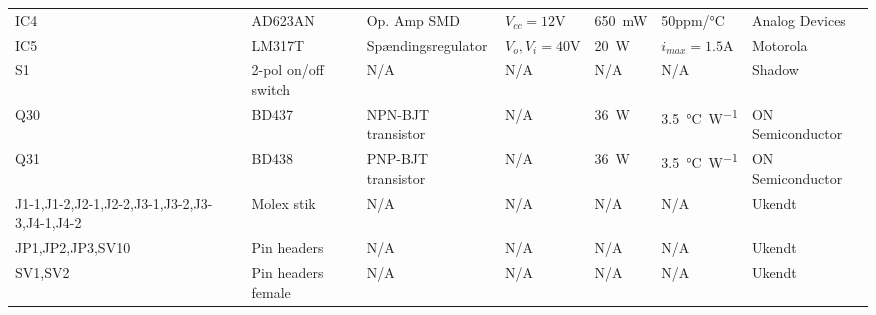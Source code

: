 \begin{table}[h!]
\begin{threeparttable}
\begin{tabular}{ l l l l l l l }
IC4 & AD623AN & Op. Amp SMD & $V_{cc} = 12 \si{\volt}$ & \SI{650}{\milli\watt} & 50ppm/\si{\celsius} & Analog Devices \\
IC5 & LM317T & Spændingsregulator & $V_{o} , V_{i} = 40 \si{\volt}$ & \SI{20}{\watt} & $i_{max} = 1.5 \si{\ampere}$ & Motorola \\
S1 & 2-pol on/off switch & N/A & N/A & N/A & N/A & Shadow \\
Q30 & BD437 & NPN-BJT transistor & N/A & \SI{36}{\watt} & \SI{3.5}{\celsius\per\watt} & ON Semiconductor \\
Q31 & BD438 & PNP-BJT transistor & N/A & \SI{36}{\watt} & \SI{3.5}{\celsius\per\watt} & ON Semiconductor \\
J1-1,J1-2,J2-1,J2-2,J3-1,J3-2,J3-3,J4-1,J4-2 & Molex stik & N/A & N/A & N/A & N/A & Ukendt\\
JP1,JP2,JP3,SV10 & Pin headers & N/A & N/A & N/A & N/A & Ukendt \\
SV1,SV2 & Pin headers female & N/A & N/A & N/A & N/A & Ukendt \\

\hline
\bottomrule
\end{tabular}
\end{threeparttable}
\end{table} 